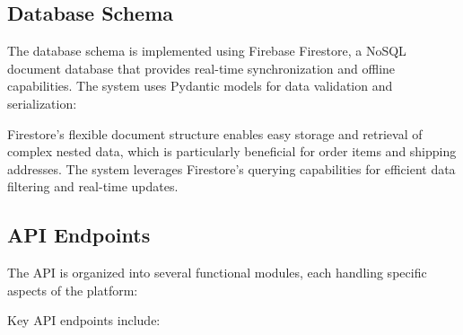 \subsection{Database Schema}

The database schema is implemented using Firebase Firestore, a NoSQL document database that provides real-time synchronization and offline capabilities. The system uses Pydantic models for data validation and serialization:

Firestore's flexible document structure enables easy storage and retrieval of complex nested data, which is particularly beneficial for order items and shipping addresses. The system leverages Firestore's querying capabilities for efficient data filtering and real-time updates.
\subsection{API Endpoints}

The API is organized into several functional modules, each handling specific aspects of the platform:

Key API endpoints include:

